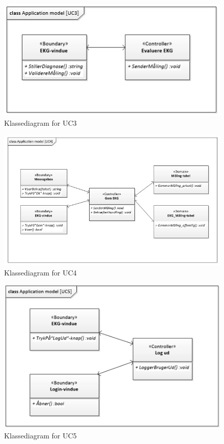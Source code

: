 \begin{figure}[H]
	\centering
	\includegraphics[width=1\textwidth]{Figurer/Snip20150429_23}
	\caption{Klassediagram for UC3}
\end{figure}

\begin{figure}[H]
	\centering
	\includegraphics[width=1\textwidth]{Figurer/Snip20150525_20}
	\caption{Klassediagram for UC4}
\end{figure}

\begin{figure}[H]
	\centering
	\includegraphics[width=1\textwidth]{Figurer/Snip20150429_25}
	\caption{Klassediagram for UC5}
\end{figure}

